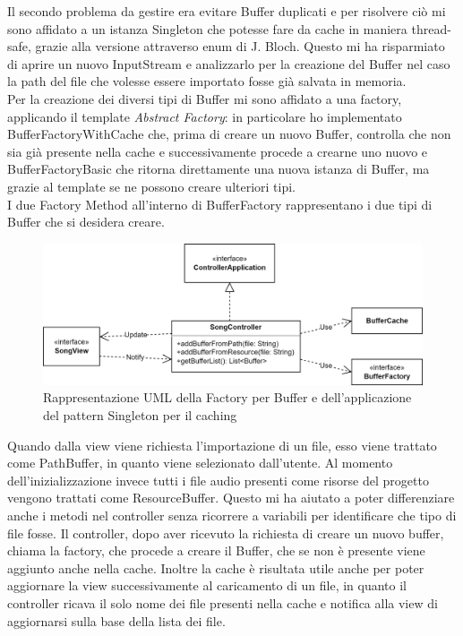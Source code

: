 \documentclass[a4paper,12pt]{report}
\begin{document}
Il secondo problema da gestire era evitare Buffer duplicati e per risolvere ciò mi sono affidato a un istanza Singleton che potesse fare da cache in maniera thread-safe, grazie alla versione attraverso enum di J. Bloch. Questo mi ha risparmiato di aprire un nuovo InputStream e analizzarlo per la creazione del Buffer nel caso la path del file che volesse essere importato fosse già salvata in memoria.
\\Per la creazione dei diversi tipi di Buffer mi sono affidato a una factory, applicando il template \textit{Abstract Factory}: in particolare ho implementato BufferFactoryWithCache che, prima di creare un nuovo Buffer, controlla che non sia già presente nella cache e successivamente procede a crearne uno nuovo e BufferFactoryBasic che ritorna direttamente una nuova istanza di Buffer, ma grazie al template se ne possono creare ulteriori tipi.
\\I due Factory Method all'interno di BufferFactory rappresentano i due tipi di Buffer che si desidera creare.
%
\begin{figure}[H]
\centering{}
\includegraphics[width=\textwidth]{img/buffer/BufferMVC.png}
\caption{Rappresentazione UML della Factory per Buffer e dell’applicazione del pattern Singleton per il caching}
\label{img:buffermvc}
\end{figure}
Quando dalla view viene richiesta l’importazione di un file, esso viene trattato come PathBuffer, in quanto viene selezionato dall’utente. Al momento dell’inizializzazione invece tutti i file audio presenti come risorse del progetto vengono trattati come ResourceBuffer. Questo mi ha aiutato a poter differenziare anche i metodi nel controller senza ricorrere a variabili per identificare che tipo di file fosse. Il controller, dopo aver ricevuto la richiesta di creare un nuovo buffer, chiama la factory, che procede a creare il Buffer, che se non è presente viene aggiunto anche nella cache. Inoltre la cache è risultata utile anche per poter aggiornare la view successivamente al caricamento di un file, in quanto il controller ricava il solo nome dei file presenti nella cache e notifica alla view di aggiornarsi sulla base della lista dei file.
%
\end{document}
